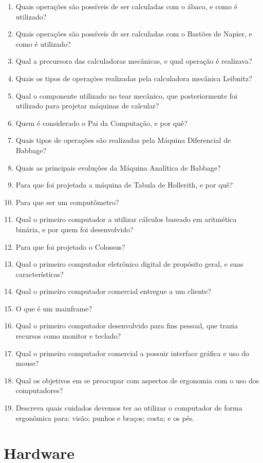 \documentclass[11pt]{article}
\begin{document}
	\begin{enumerate}
		\item Quais opera\c cões são possíveis de ser calculadas com o ábaco, e como é utilizado?
		\item Quais opera\c cões são possíveis de ser calculadas com o Bastões de Napier, e como é utilizado?
		\item Qual a precursora das calculadoras mecânicas, e qual opera\c cão é realizava?
		\item Quais os tipos de operações realizadas pela calculadora mecânica Leibnitz?
		\item Qual o componente utilizado no tear mecânico, que posteriormente foi utilizado para projetar máquinas de calcular?
		\item Quem é considerado o Pai da Computa\c cão, e por quê?
		\item Quais tipos de operações são realizadas pela Máquina Diferencial de Babbage?
		\item Quais as principais evoluções da Máquina Analítica de Babbage?
		\item Para que foi projetada a máquina de Tabula de Hollerith, e por quê?
		\item Para que ser um computômetro?
		\item Qual o primeiro computador a utilizar cálculos baseado em aritmética binária, e por quem foi desenvolvido?
		\item Para que foi projetado o Colossus?
		\item Qual o primeiro computador eletrônico digital de propósito geral, e suas características?
		\item Qual o primeiro computador comercial entregue a um cliente?
		\item O que é um mainframe?
		\item Qual o primeiro computador desenvolvido para fins pessoal, que trazia recursos como monitor e teclado?
		\item Qual o primeiro computador comercial a possuir interface gráfica e uso do mouse?
		\item Qual os objetivos em se preocupar com aspectos de ergonomia com o uso dos computadores?
		\item Descreva quais cuidados devemos ter ao utilizar o computador de forma ergonômica para: visão; punhos e bra\c cos; costa; e os pés.
	\end{enumerate}
	
	\newpage
	\section{Hardware}
	
\end{document}
